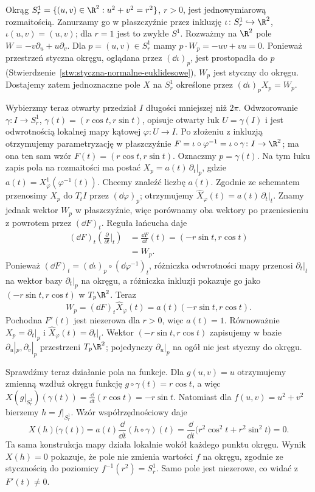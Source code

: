 \begin{przyklad}
Okrąg $S_r^1=\{(u,v)\in\R^2:u^2+v^2=r^2\}$, $r>0$,
jest jednowymiarową rozmaitością. Zanurzamy go w płaszczyźnie
przez inkluzję $\iota\colon S_r^1\hookrightarrow\R^2$,
$\iota(u,v)=(u,v)$; dla $r=1$ jest to zwykłe $S^1$.
Rozważmy na $\R^2$ pole
$W=-v\partial_u+u\partial_v$. Dla $p=(u,v)\in S_r^1$ mamy
$p\cdot W_p=-uv+vu=0$. Ponieważ przestrzeń styczna okręgu,
oglądana przez $(\dd\iota)_p$, jest prostopadła do $p$
(Stwierdzenie~\ref{stw:styczna-normalne-euklidesowe}),
$W_p$ jest styczny do okręgu. Dostajemy zatem jednoznaczne
pole $X$ na $S_r^1$ określone przez $(\dd\iota)_pX_p=W_p$.

Wybierzmy teraz otwarty przedział $I$ długości mniejszej niż $2\pi$.
Odwzorowanie $\gamma\colon I\to S_r^1$,
$\gamma(t)=(r\cos t,r\sin t)$, opisuje otwarty łuk
$U=\gamma(I)$ i jest odwrotnością lokalnej mapy kątowej
$\varphi\colon U\to I$. Po złożeniu z inkluzją otrzymujemy
parametryzację w płaszczyźnie
$F=\iota\circ\varphi^{-1}=\iota\circ\gamma\colon I\to\R^2$;
ma ona ten sam wzór $F(t)=(r\cos t,r\sin t)$.
Oznaczmy $p=\gamma(t)$. Na tym łuku zapis pola na rozmaitości
ma postać $X_p=a(t)\,\partial_t|_p$, gdzie
$a(t)=X_\varphi^1(\varphi^{-1}(t))$.
Chcemy znaleźć liczbę $a(t)$.
Zgodnie ze schematem przenosimy $X_p$ do $T_tI$ przez
$(\dd\varphi)_p$; otrzymujemy
$\widehat X_\varphi(t)=a(t)\,\partial_t|_t$.
Znamy jednak wektor $W_p$ w płaszczyźnie, więc porównamy oba
wektory po przeniesieniu z powrotem przez $(\dd F)_t$.
Reguła łańcucha daje
\[
\begin{aligned}
(\dd F)_t\!\left(\frac{\partial}{\partial t}\Big|_t\right)
&=\frac{\dd F}{\dd t}(t)
=(-r\sin t,r\cos t)\\
&=W_p.
\end{aligned}
\]
Ponieważ $(\dd F)_t=(\dd\iota)_p\circ(\dd\varphi^{-1})_t$,
różniczka odwrotności mapy przenosi $\partial_t|_t$ na wektor
bazy $\partial_t|_p$ na okręgu, a różniczka inkluzji pokazuje
go jako $(-r\sin t,r\cos t)$ w $T_p\R^2$.
Teraz
\[
W_p=(\dd F)_t\widehat X_\varphi(t)
=a(t)(-r\sin t,r\cos t).
\]
Pochodna $F'(t)$ jest niezerowa dla $r>0$, więc $a(t)=1$.
Równoważnie $X_p=\partial_t|_p$ i
$\widehat X_\varphi(t)=\partial_t|_t$. Wektor
$(-r\sin t,r\cos t)$ zapisujemy w bazie
$\partial_u|_p,\partial_v|_p$ przestrzeni $T_p\R^2$;
pojedynczy $\partial_u|_p$ na ogół nie jest styczny do okręgu.

Sprawdźmy teraz działanie pola na funkcje. Dla $g(u,v)=u$
otrzymujemy zmienną wzdłuż okręgu funkcję
$g\circ\gamma(t)=r\cos t$, a więc
$X(g|_{S_r^1})(\gamma(t))=\frac{\dd}{\dd t}(r\cos t)=-r\sin t$.
Natomiast dla $f(u,v)=u^2+v^2$ bierzemy
$h=f|_{S_r^1}$. Wzór współrzędnościowy daje
\[
X(h)\bigl(\gamma(t)\bigr)
=a(t)\frac{\dd}{\dd t}(h\circ\gamma)(t)
=\frac{\dd}{\dd t}\bigl(r^2\cos^2t+r^2\sin^2t\bigr)=0.
\]
Ta sama konstrukcja mapy działa lokalnie wokół każdego punktu okręgu.
Wynik $X(h)=0$ pokazuje, że pole nie zmienia wartości $f$ na
okręgu, zgodnie ze stycznością do poziomicy $f^{-1}(r^2)=S_r^1$.
Samo pole jest niezerowe, co widać z $F'(t)\ne0$.
\end{przyklad}

